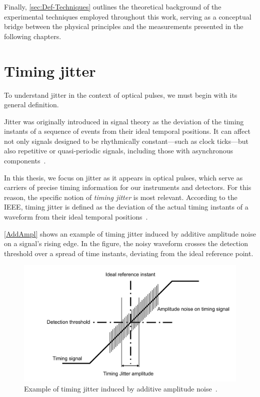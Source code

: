 Finally, \autoref{sec:Def-Techniques} outlines the theoretical background of the experimental techniques employed throughout this work, serving as a conceptual bridge between the physical principles and the measurements presented in the following chapters.

\section{Timing jitter}
\label{Sec:Def-Jitter}

To understand jitter in the context of optical pulses, we must begin with its general definition.

Jitter was originally introduced in signal theory as the deviation of the timing instants of a sequence of events from their ideal temporal positions. It can affect not only signals designed to be rhythmically constant—such as clock ticks—but also repetitive or quasi-periodic signals, including those with asynchronous components~\cite{General_IEEE}.

In this thesis, we focus on jitter as it appears in optical pulses, which serve as carriers of precise timing information for our instruments and detectors. For this reason, the specific notion of \emph{timing jitter} is most relevant. According to the IEEE, timing jitter is defined as the deviation of the actual timing instants of a waveform from their ideal temporal positions~\cite{General_IEEE}.

\autoref{AddAmpl} shows an example of timing jitter induced by additive amplitude noise on a signal’s rising edge. In the figure, the noisy waveform crosses the detection threshold over a spread of time instants, deviating from the ideal reference point.



\begin{figure}[hbtp]
\centering
\includegraphics[width=1\textwidth]{AmplitudeAdditiveNoise}
\caption{Example of timing jitter induced by additive amplitude noise~\cite{General_IEEE}.}
\label{AddAmpl}
\end{figure}

